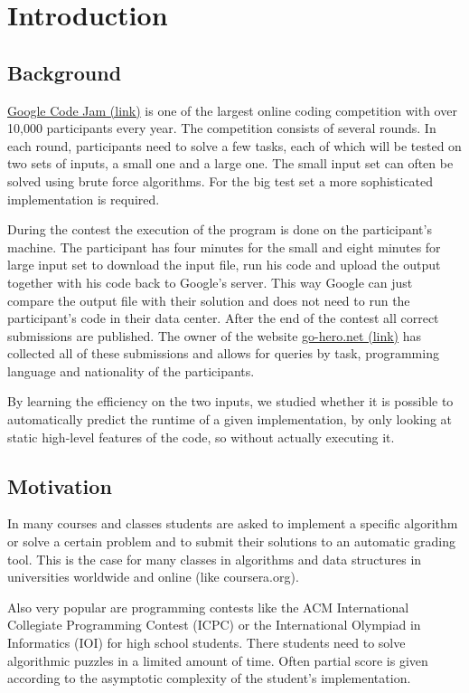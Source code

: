 \section{Introduction}
\subsection*{Background}
\href{https://code.google.com/codejam}{Google Code Jam (link)} is one of the largest online coding competition with over 10,000 participants every year. The competition consists of several rounds. In each round, participants need to solve a few tasks, each of which will be tested on two sets of inputs, a small one and a large one. The small input set can often be solved using brute force algorithms. For the big test set a more sophisticated implementation is required.

During the contest the execution of the program is done on the participant's machine. The participant has four minutes for the small and eight minutes for large input set to download the input file, run his code and upload the output together with his code back to Google's server. This way Google can just compare the output file with their solution and does not need to run the participant's code in their data center.
After the end of the contest all correct submissions are published.
The owner of the website \href{http://www.go-hero.net/jam/13}{go-hero.net (link)} has collected all of these submissions and allows for queries by task, programming language and nationality of the participants.

By learning the efficiency on the two inputs, we studied whether it is possible to automatically predict the runtime of a given implementation, by only looking at static high-level features of the code, so without actually executing it.

\subsection*{Motivation}
In many courses and classes students are asked to implement a specific algorithm or solve a certain problem and to submit their solutions to an automatic grading tool. This is the case for many classes in algorithms and data structures in universities worldwide and online (like coursera.org).

Also very popular are programming contests like the ACM International Collegiate Programming Contest (ICPC) or the International Olympiad in Informatics (IOI) for high school students. There students need to solve algorithmic puzzles in a limited amount of time. Often partial score is given according to the asymptotic complexity of the student’s implementation.

